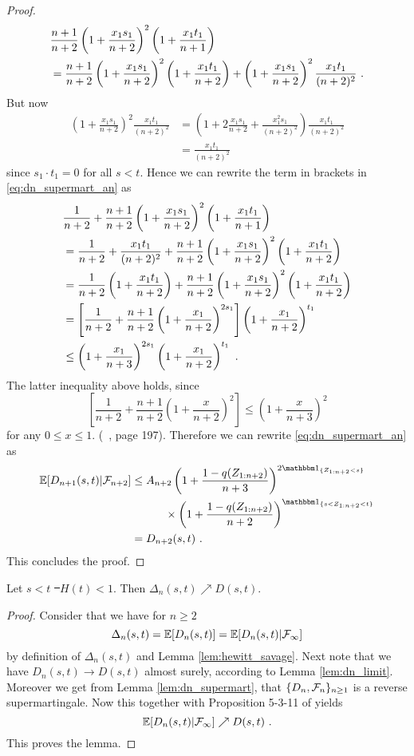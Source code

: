 \begin{lemma}
\begin{proof}
\begin{align*}
		&\frac{n+1}{n+2}\left(1+\frac{x_1s_1}{n+2}\right)^{2} \left(1+\frac{x_1t_1}{n+1}\right) \\
		&= \frac{n+1}{n+2}\left(1+\frac{x_1s_1}{n+2}\right)^{2}\left(1+\frac{x_1t_1}{n+2}\right) + \left(1+\frac{x_1s_1}{n+2}\right)^{2}\frac{x_1t_1}{(n+2)^2}\textrm{ .} 
		\end{align*}
		But now 
		\begin{align*}
		\left(1+\frac{x_1s_1}{n+2}\right)^{2}\frac{x_1t_1}{(n+2)^2} &= \left(1+2\frac{x_1s_1}{n+2}+\frac{x^2_1s_1}{(n+2)^2}\right)\frac{x_1t_1}{(n+2)^2}\\
		&= \frac{x_1t_1}{(n+2)^2}
		\end{align*}
		since $s_1\cdot t_1=0$ for all $s<t$. Hence we can rewrite the term in brackets in \eqref{eq:dn_supermart_an} as 
		\begin{align*}
		&\frac{1}{n+2} + \frac{n+1}{n+2}\left(1+\frac{x_1s_1}{n+2}\right)^{2} \left(1+\frac{x_1t_1}{n+1}\right) \\
		&=\frac{1}{n+2} + \frac{x_1t_1}{(n+2)^2} + \frac{n+1}{n+2}\left(1+\frac{x_1s_1}{n+2}\right)^{2}\left(1+\frac{x_1t_1}{n+2}\right)\\
		&=\frac{1}{n+2}\left(1+\frac{x_1t_1}{n+2}\right) + \frac{n+1}{n+2}\left(1+\frac{x_1s_1}{n+2}\right)^{2}\left(1+\frac{x_1t_1}{n+2}\right)\\
		&=\left[\frac{1}{n+2} + \frac{n+1}{n+2}\left(1+\frac{x_1}{n+2}\right)^{2s_1}\right]\left(1+\frac{x_1}{n+2}\right)^{t_1}\\
		&\leq \left(1+\frac{x_1}{n+3}\right)^{2s_1}\left(1+\frac{x_1}{n+2}\right)^{t_1}\textrm{ .} 
		\end{align*}
		The latter inequality above holds, since 
		$$\left[\frac{1}{n+2} + \frac{n+1}{n+2}\left(1+\frac{x}{n+2}\right)^{2}\right] \leq \left(1+\frac{x}{n+3}\right)^{2}$$
		for any $0\leq x\leq 1$. (\cf\ \cite{bose1999strong}, page 197). Therefore we can rewrite \eqref{eq:dn_supermart_an} as
		\begin{align*}
		\E[D_{n+1}(s,t)| \F_{n+2}]	&\leq A_{n+2} \left(1+\frac{1-q(Z_{1:n+2})}{n+3}\right)^{2\I{Z_{1:n+2}<s}} \\
		&\qquad\quad \times \left(1+\frac{1-q(Z_{1:n+2})}{n+2}\right)^{\I{s<Z_{1:n+2} <t}}\\
		&= D_{n+2}(s,t)\mdot
		\end{align*}		
		This concludes the proof.
	\end{proof}
\end{lemma}
%
\begin{lemma}Let $s<t$ \st\ $H(t)<1$. Then $\Delta_{n}(s,t) \nearrow D(s,t)$.
	\label{lem:neveu}
	\begin{proof}
		Consider that we have for $n\geq 2$
		$$\Delta_{n}(s,t) = \mathbb{E}[D_n(s,t)] = \mathbb{E}[D_n(s,t)|\mathcal{F}_\infty] $$
		by definition of $\Delta_{n}(s,t)$ and Lemma \ref{lem:hewitt_savage}. Next note that we have $D_n(s,t) \to D(s,t)$ almost surely, according to Lemma \ref{lem:dn_limit}. Moreover we get from Lemma \ref{lem:dn_supermart}, that $\{D_n,\mathcal{F}_n\}_{n\geq 1}$ is a reverse supermartingale. Now this together with Proposition 5-3-11 of \cite{neveu1975discrete} yields
		$$\mathbb{E}[D_n(s,t)|\mathcal{F}_\infty] \nearrow D(s,t)\textrm{ .}$$
		This proves the lemma.
	\end{proof}
\end{lemma}
